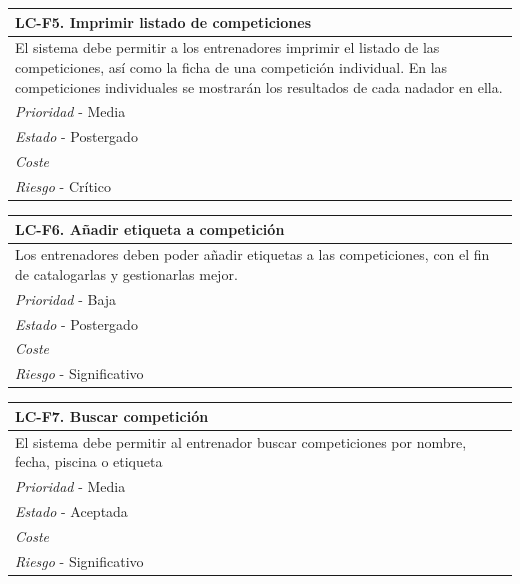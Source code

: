	\begin{center}
		\begin{tabularx}{15cm}{|X|}
			\hline 
				\bf{LC-F5. Imprimir listado de competiciones}\\
			\hline
				El sistema debe permitir a los entrenadores imprimir el listado de las competiciones, así como la ficha de una competición individual. En las competiciones individuales se mostrarán los resultados de cada nadador en ella.\\
			\hline
				{\it Prioridad} - Media\\
			\hline
				{\it Estado} - Postergado\\
			\hline
				{\it Coste}\\
			\hline
				{\it Riesgo} - Crítico\\
			\hline
		\end{tabularx}
	\end{center}
	
	\begin{center}
		\begin{tabularx}{15cm}{|X|}
			\hline 
				\bf{LC-F6. Añadir etiqueta a competición}\\
			\hline
				Los entrenadores deben poder añadir etiquetas a las competiciones, con el fin de catalogarlas y gestionarlas mejor.\\
			\hline
				{\it Prioridad} - Baja\\
			\hline
				{\it Estado} - Postergado\\
			\hline
				{\it Coste}\\
			\hline
				{\it Riesgo} - Significativo\\
			\hline
		\end{tabularx}
	\end{center}
	
	\begin{center}
		\begin{tabularx}{15cm}{|X|}
			\hline 
				\bf{LC-F7. Buscar competición}\\
			\hline
				El sistema debe permitir al entrenador buscar competiciones por nombre, fecha, piscina o etiqueta\\
			\hline
				{\it Prioridad} - Media\\
			\hline
				{\it Estado} - Aceptada\\
			\hline
				{\it Coste}\\
			\hline
				{\it Riesgo} - Significativo\\
			\hline
		\end{tabularx}
	\end{center}
	
